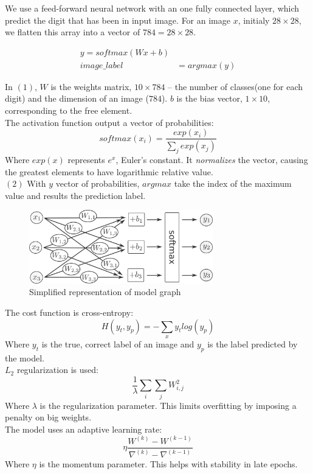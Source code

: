 \documentclass[a4paper]{article}
\begin{document}
We use a feed-forward neural network with an one fully connected layer, which predict the digit that has been in input image.
For an image $x$, initialy $28 \times 28$, we flatten this array into a vector of $784 = 28 \times 28$.


\begin{align}
y = softmax(Wx + b) \\
image\_label &= argmax(y)
\end{align}

In $(1)$, $W$ is the weights matrix, $10 \times 784$ -- the number of classes(one for each digit) and the dimension of an image ($784$). $b$ is the bias vector, $1 \times 10$, corresponding to the free element.
\\

The activation function output a vector of probabilities:
$$softmax(x_i)=\frac{exp(x_i)}{\sum_j exp(x_j)}$$
Where $exp(x)$ represents $e^x$, Euler's constant. It \textit{normalizes} the vector, causing the greatest elements to have logarithmic relative value.
\\

$(2)$ With $y$ vector of probabilities, $argmax$ take the index of the maximum value and results the prediction label.

\begin{figure}[htb]
\centering
\includegraphics[width=8cm]{images/model-graph.png}
\caption{Simplified representation of model graph \cite{tf}}
\end{figure}

The cost function is cross-entropy:
$$H(y_t, y_p)=-\sum_x y_t log(y_p)$$
Where $y_t$ is the true, correct label of an image and $y_p$ is the label predicted by the model.
\\

$L_2$ regularization is used:
$$\frac{1}{\lambda} \sum_i \sum_j W_{i,j}^2$$
Where $\lambda$ is the regularization parameter. This limits overfitting by imposing a penalty on big weights.
\\

The model uses an adaptive learning rate:
$$\eta \frac{ W^{(k)} - W^{(k-1)} } { \nabla^{(k)} - \nabla^{(k-1)} }$$
Where $\eta$ is the momentum parameter. This helps with stability in late epochs.
\end{document}
